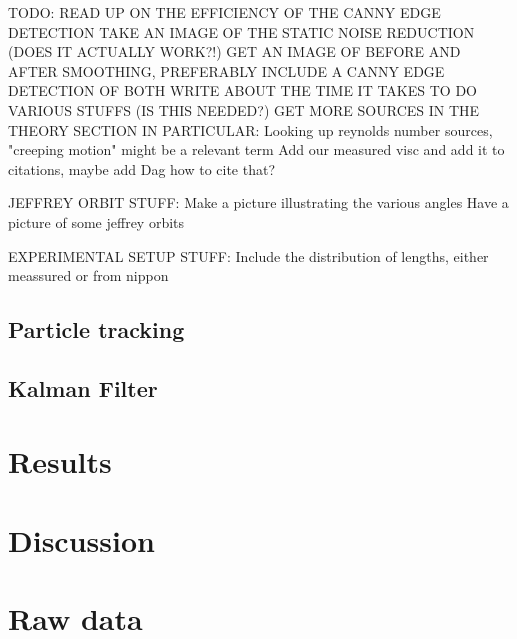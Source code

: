 \documentclass[]{report}
\begin{document}
TODO:
READ UP ON THE EFFICIENCY OF THE CANNY EDGE DETECTION
TAKE AN IMAGE OF THE STATIC NOISE REDUCTION (DOES IT ACTUALLY WORK?!)
GET AN IMAGE OF BEFORE AND AFTER SMOOTHING, PREFERABLY INCLUDE A CANNY EDGE DETECTION OF BOTH 
WRITE ABOUT THE TIME IT TAKES TO DO VARIOUS STUFFS (IS THIS NEEDED?)
GET MORE SOURCES IN THE THEORY SECTION
IN PARTICULAR:
Looking up reynolds number sources, "creeping motion" might be a relevant term
Add our measured visc and add it to citations, maybe add Dag how to cite that?


JEFFREY ORBIT STUFF:
Make a picture illustrating the various angles
Have a picture of some jeffrey orbits

EXPERIMENTAL SETUP STUFF:
Include the distribution of lengths, either meassured or from nippon


\section{Particle tracking}


\section{Kalman Filter}



\chapter{Results}

\chapter{Discussion}

\appendix
\chapter{Raw data}

%
%
%
%
%


\end{document}

